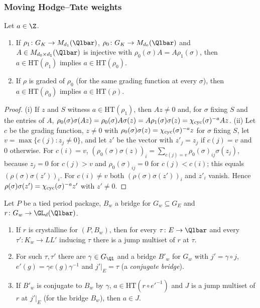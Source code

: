 \subsubsection{Moving Hodge--Tate weights}

\begin{lemma}\label{pf:steps1:occmove}
Let $a\in\Z$.
\begin{enumerate}[label=\textup{(\roman*)},nosep]
\item If $\rho_1\colon G_K\to M_{d_1}(\Qlbar)$, $\rho_0\colon G_K\to M_{d_0}(\Qlbar)$ and $A\in M_{d_0\times d_1}(\Qlbar)$ is
  injective with $\rho_0(\sigma)A=A\rho_1(\sigma)$, then $a\in\mathrm{HT}(\rho_1)$ implies $a\in\mathrm{HT}(\rho_0)$.
\item If $\rho$ is graded of $\rho_0$ (for the same grading function at every $\sigma$), then $a\in\mathrm{HT}(\rho_0)$
  implies $a\in\mathrm{HT}(\rho)$.
\end{enumerate}
\end{lemma}

\begin{proof}
(i) If $z$ and $S$ witness $a\in\mathrm{HT}(\rho_1)$, then $Az\ne0$ and, for $\sigma$ fixing $S$ and the entries of $A$,
$\rho_0(\sigma)\sigma(Az)=\rho_0(\sigma)A\sigma(z)=A\rho_1(\sigma)\sigma(z)=\chi_{\mathrm{cyc}}(\sigma)^{-a}Az$.
(ii) Let $c$ be the grading function, $z\ne0$ with $\rho_0(\sigma)\sigma(z)=\chi_{\mathrm{cyc}}(\sigma)^{-a}z$ for $\sigma$ fixing $S$, let
$v=\max\{c(j):z_j\ne0\}$, and let $z'$ be the vector with $z'_j=z_j$ if $c(j)=v$ and $0$ otherwise. For $c(i)=v$,
$(\rho_0(\sigma)\sigma(z))_i=\sum_{c(j)=v}\rho_0(\sigma)_{ij}\sigma(z_j)$, because $z_j=0$ for $c(j)>v$ and
$\rho_0(\sigma)_{ij}=0$ for $c(j)<c(i)$; this equals $(\rho(\sigma)\sigma(z'))_i$. For $c(i)\ne v$ both
$(\rho(\sigma)\sigma(z'))_i$ and $z'_i$ vanish. Hence $\rho(\sigma)\sigma(z')=\chi_{\mathrm{cyc}}(\sigma)^{-a}z'$ with $z'\ne0$.
\end{proof}

\begin{lemma}\label{pf:steps1:jumps}
Let $P$ be a tied period package, $B_w$ a bridge for $G_w\subseteq G_E$ and $r\colon G_w\to\GL_d(\Qlbar)$.
\begin{enumerate}[label=\textup{(\roman*)},nosep]
\item If $r$ is crystalline for $(P,B_w)$, then for every $\tau\colon E\to\Qlbar$ and every $\tau'\colon K_w\to LL'$
  inducing $\tau$ there is a jump multiset of $r$ at $\tau$.
\item For such $\tau,\tau'$ there are $\gamma\in G_{\Ql}$ and a bridge $B'_w$ for $G_w$ with $j'=\gamma\circ j$,
  $e'(g)=\gamma e(g)\gamma^{-1}$ and $j'|_E=\tau$ (a \emph{conjugate bridge}).
\item If $B'_w$ is conjugate to $B_w$ by $\gamma$, $a\in\mathrm{HT}(r\circ e'^{-1})$ and $J$ is a jump multiset of $r$ at
  $j'|_E$ (for the bridge $B_w$), then $a\in J$.
\end{enumerate}
 
\end{lemma}

